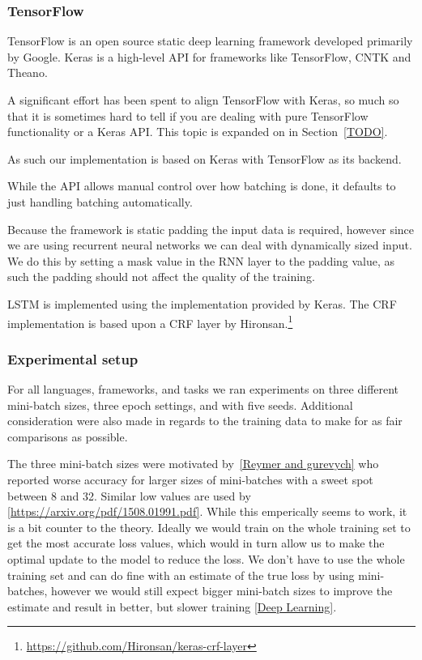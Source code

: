 \subsubsection*{TensorFlow}
TensorFlow is an open source static deep learning framework developed primarily
by Google. Keras is a high-level API for frameworks like TensorFlow, CNTK and
Theano.

A significant effort has been spent to align TensorFlow with Keras, so much so
that it is sometimes hard to tell if you are dealing with pure TensorFlow
functionality or a Keras API\@. This topic is expanded on in Section~\ref{TODO}.

As such our implementation is based on Keras with TensorFlow as its
backend.

While the API allows manual control over how batching is done, it defaults to
just handling batching automatically.

Because the framework is static padding the input data is required, however
since we are using recurrent neural networks we can deal with dynamically sized
input. We do this by setting a mask value in the RNN layer to the padding
value, as such the padding should not affect the quality of the training.

LSTM is implemented using the implementation provided by Keras.
The CRF implementation is based upon a CRF layer by
Hironsan.\footnote{\url{https://github.com/Hironsan/keras-crf-layer}}

\subsubsection{Experimental setup}

For all languages, frameworks, and tasks we ran experiments on three different
mini-batch sizes, three epoch settings, and with five seeds. Additional
consideration were also made in regards to the training data to make for as fair
comparisons as possible.

The three mini-batch sizes were motivated by~\ref{Reymer and gurevych} who
reported worse accuracy for larger sizes of mini-batches with a sweet spot
between 8 and 32. Similar low values are used by
\ref{https://arxiv.org/pdf/1508.01991.pdf}. While this emperically seems to
work, it is a bit counter to the theory. Ideally we would train on the whole
training set to get the most accurate loss values, which would in turn allow us
to make the optimal update to the model to reduce the loss. We don't have to use
the whole training set and can do fine with an estimate of the true loss by
using mini-batches, however we would still expect bigger mini-batch sizes to
improve the estimate and result in better, but slower training \ref{Deep
Learning}. 

